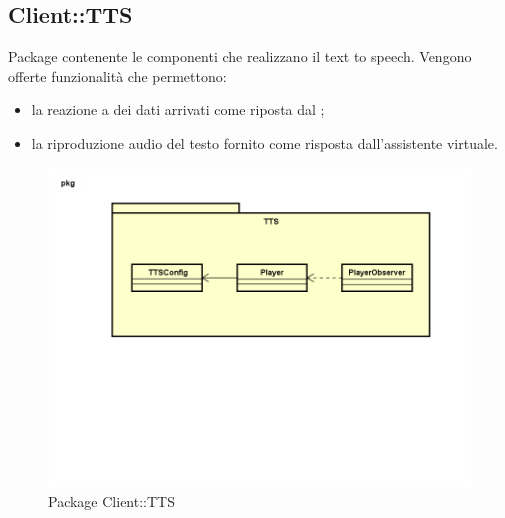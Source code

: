 \subsection{Client::TTS}
Package contenente le componenti che realizzano il text to speech. Vengono offerte funzionalità che permettono: \begin{itemize} \item la reazione a dei dati arrivati come riposta dal ; \item la riproduzione audio del testo fornito come risposta dall'assistente virtuale. \end{itemize}
\begin{figure}[h] \centering \includegraphics[width=\textwidth,height=\textheight,keepaspectratio]{images/diagrams/client/Client/TTS.png}
\caption{Package Client::TTS}
\end{figure}
\newpage


